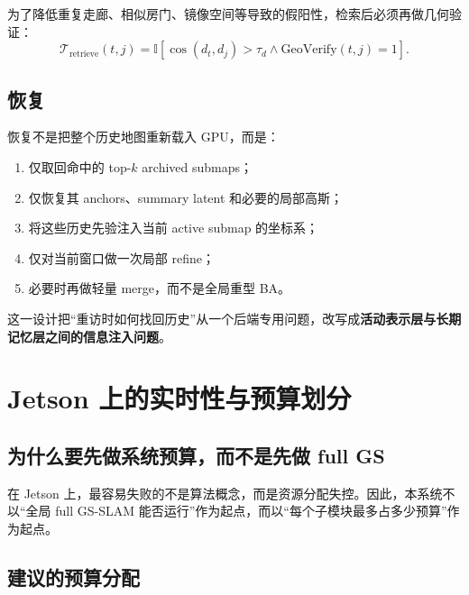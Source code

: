 \documentclass[12pt]{article}
\begin{document}
为了降低重复走廊、相似房门、镜像空间等导致的假阳性，检索后必须再做几何验证：
\begin{equation}
\mathcal{T}_{\text{retrieve}}(t,j)=\mathbb{I}\left[\cos(d_t,d_j)>\tau_d \land \mathrm{GeoVerify}(t,j)=1\right].
\end{equation}

\subsection{恢复}

恢复不是把整个历史地图重新载入 GPU，而是：
\begin{enumerate}
  \item 仅取回命中的 top-$k$ archived submaps；
  \item 仅恢复其 anchors、summary latent 和必要的局部高斯；
  \item 将这些历史先验注入当前 active submap 的坐标系；
  \item 仅对当前窗口做一次局部 refine；
  \item 必要时再做轻量 merge，而不是全局重型 BA。
\end{enumerate}

这一设计把“重访时如何找回历史”从一个后端专用问题，改写成\textbf{活动表示层与长期记忆层之间的信息注入问题}。

\section{Jetson 上的实时性与预算划分}

\subsection{为什么要先做系统预算，而不是先做 full GS}

在 Jetson 上，最容易失败的不是算法概念，而是资源分配失控。因此，本系统不以“全局 full GS-SLAM 能否运行”作为起点，而以“每个子模块最多占多少预算”作为起点。

\subsection{建议的预算分配}
\end{document}
